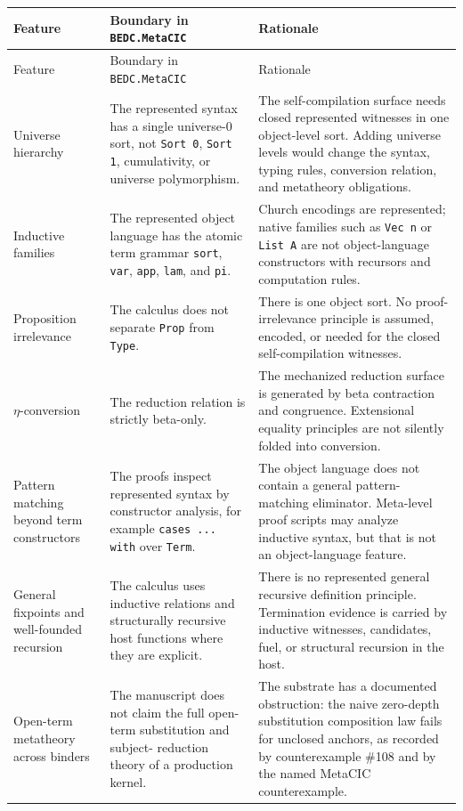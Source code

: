 \begin{longtable}{p{}p{}p{}}
\toprule
Feature & Boundary in \texttt{BEDC.MetaCIC} & Rationale \\
\midrule
\endfirsthead
\toprule
Feature & Boundary in \texttt{BEDC.MetaCIC} & Rationale \\
\midrule
\endhead
Universe hierarchy &
The represented syntax has a single universe-$0$ sort, not
\texttt{Sort 0}, \texttt{Sort 1}, cumulativity, or universe polymorphism. &
The self-compilation surface needs closed represented witnesses in one
object-level sort.  Adding universe levels would change the syntax, typing
rules, conversion relation, and metatheory obligations. \\
Inductive families &
The represented object language has the atomic term grammar
\texttt{sort}, \texttt{var}, \texttt{app}, \texttt{lam}, and \texttt{pi}. &
Church encodings are represented; native families such as \texttt{Vec n} or
\texttt{List A} are not object-language constructors with recursors and
computation rules. \\
Proposition irrelevance &
The calculus does not separate \texttt{Prop} from \texttt{Type}. &
There is one object sort.  No proof-irrelevance principle is assumed, encoded,
or needed for the closed self-compilation witnesses. \\
$\eta$-conversion &
The reduction relation is strictly beta-only. &
The mechanized reduction surface is generated by beta contraction and
congruence.  Extensional equality principles are not silently folded into
conversion. \\
Pattern matching beyond term constructors &
The proofs inspect represented syntax by constructor analysis, for example
\texttt{cases ... with} over \texttt{Term}. &
The object language does not contain a general pattern-matching eliminator.
Meta-level proof scripts may analyze inductive syntax, but that is not an
object-language feature. \\
General fixpoints and well-founded recursion &
The calculus uses inductive relations and structurally recursive host
functions where they are explicit. &
There is no represented general recursive definition principle.  Termination
evidence is carried by inductive witnesses, candidates, fuel, or structural
recursion in the host. \\
Open-term metatheory across binders &
The manuscript does not claim the full open-term substitution and subject-
reduction theory of a production kernel. &
The substrate has a documented obstruction: the naive zero-depth substitution
composition law fails for unclosed anchors, as recorded by counterexample
\#108 and by the named MetaCIC counterexample. \\
\bottomrule
\end{longtable}

